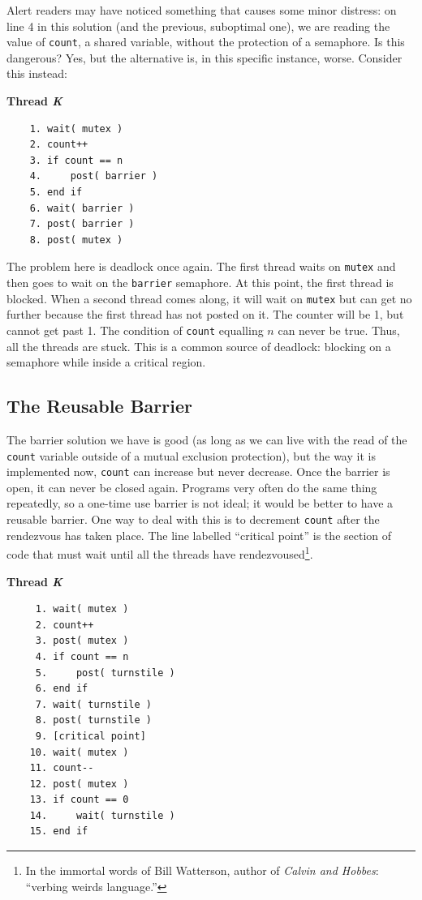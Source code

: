 Alert readers may have noticed something that causes some minor distress: on line 4 in this solution (and the previous, suboptimal one), we are reading the value of \texttt{count}, a shared variable, without the protection of a semaphore. Is this dangerous? Yes, but the alternative is, in this specific instance, worse. Consider this instead:

\textbf{Thread \textit{K}}\vspace{-2em}
\begin{verbatim}
	1. wait( mutex )
	2. count++
	3. if count == n
	4.     post( barrier )
	5. end if
	6. wait( barrier )
	7. post( barrier )
	8. post( mutex )
  \end{verbatim}
\vspace{-2em}

The problem here is deadlock once again. The first thread waits on \texttt{mutex} and then goes to wait on the \texttt{barrier} semaphore. At this point, the first thread is blocked. When a second thread comes along, it will wait on \texttt{mutex} but can get no further because the first thread has not posted on it. The counter will be 1, but cannot get past 1. The condition of \texttt{count} equalling $n$ can never be true. Thus, all the threads are stuck. This is a common source of deadlock: blocking on a semaphore while inside a critical region.

\subsection*{The Reusable Barrier}
The barrier solution we have is good (as long as we can live with the read of the \texttt{count} variable outside of a mutual exclusion protection), but the way it is implemented now, \texttt{count} can increase but never decrease. Once the barrier is open, it can never be closed again. Programs very often do the same thing repeatedly, so a one-time use barrier is not ideal; it would be better to have a reusable barrier. One way to deal with this is to decrement \texttt{count} after the rendezvous has taken place. The line labelled ``critical point'' is the section of code that must wait until all the threads have rendezvoused\footnote{In the immortal words of Bill Watterson, author of \textit{Calvin and Hobbes}: ``verbing weirds language.''}.


\textbf{Thread \textit{K}}\vspace{-2em}
\begin{verbatim}
	 1. wait( mutex )
	 2. count++
	 3. post( mutex )
	 4. if count == n
	 5.     post( turnstile )
	 6. end if
	 7. wait( turnstile )
	 8. post( turnstile )
	 9. [critical point]
	10. wait( mutex )
	11. count--
	12. post( mutex )
	13. if count == 0
	14.     wait( turnstile )
	15. end if
  \end{verbatim}
\vspace{-2em}

